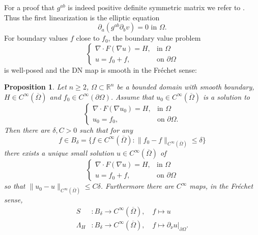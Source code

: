 \documentclass[a4paper, 10pt, twoside, notitlepage]{amsart}
\theoremstyle{plain}
\newtheorem{prop}{Proposition}[section]
\newcommand{\Om}{\Omega}
\numberwithin{equation}{section}
\newcommand {\R} {\mathbb{R}} \newcommand {\Z} {\mathbb{Z}}
\newcommand {\p} {\partial}
\newcommand{\ol}[1]{\overline{#1}}
\newcommand{\norm}[1]{\lVert #1 \rVert}
\newcommand{\janne}[1]{\begin{quotation}[\textbf{\color{purple}Janne's comment:\
		}{\color{purple}\textit{#1}}]\end{quotation}}
\begin{document}
For a proof that $g^{ab}$ is indeed positive definite symmetric matrix we refer to \cite[Chapter 10]{gilbarg2001elliptic}. Thus the first linearization is the elliptic equation
\begin{equation}\label{first_lin_vol0}
	\p_a(g^{ab}\p_bv)=0 \text{ in }\Om.
\end{equation}
For boundary values $f$ close to $f_0$, the boundary value problem
\begin{equation*}
	\left\{\begin{array}{ll}
		\nabla\cdot F(\nabla u)=H, & \text{in}\,\, \Om \\
		u=f_0 + f, & \text{on}\,\, \partial\Om
	\end{array} \right.
\end{equation*}
is well-posed and  the DN map is smooth in the Fréchet sense:
\begin{prop}
	Let $n\geq2$, $\Om\subset\R^n$ be a bounded domain with smooth boundary, $H\in C^{\infty}(\ol{\Om})$ and $f_0\in C^{\infty}(\p\Om)$. Assume that $u_0\in C^{\infty}(\ol{\Om})$ is a solution to
	\begin{equation*}
		\left\{\begin{array}{ll}
			\nabla\cdot F(\nabla u_0)=H, & \text{in}\,\, \Om \\
			u_0=f_0, & \text{on}\,\, \partial\Om.
		\end{array} \right.
	\end{equation*}
	Then there are $\delta, C>0$ such that for any
	\begin{equation*}
		f\in B_{\delta}=\{f\in C^{\infty}(\ol{\Om}) : \norm{f_0 - f}_{C^{\infty}(\ol{\Om})}\leq\delta\}
	\end{equation*}
	there exists a unique small solution $u\in C^{\infty}(\ol{\Om})$ of
	\begin{equation*}
		\left\{\begin{array}{ll}
			\nabla\cdot F(\nabla u)=H, & \text{in}\,\, \Om \\
			u=f_0 + f, & \text{on}\,\, \partial\Om
		\end{array} \right.
	\end{equation*}
	so that $\norm{u_0 - u}_{C^{\infty}(\ol{\Om})}\leq C\delta$. Furthermore there are $C^{\infty}$ maps, in the Fréchet sense,
	\begin{align*}
		S&\colon B_{\delta}\to C^{\infty}(\ol{\Om}), \quad f\mapsto u\\
		\Lambda_H&\colon B_{\delta}\to C^{\infty}(\ol{\Om}), \quad f\mapsto \p_{\nu}u|_{\p\Om}.
	\end{align*}
\end{prop}
\end{document}
